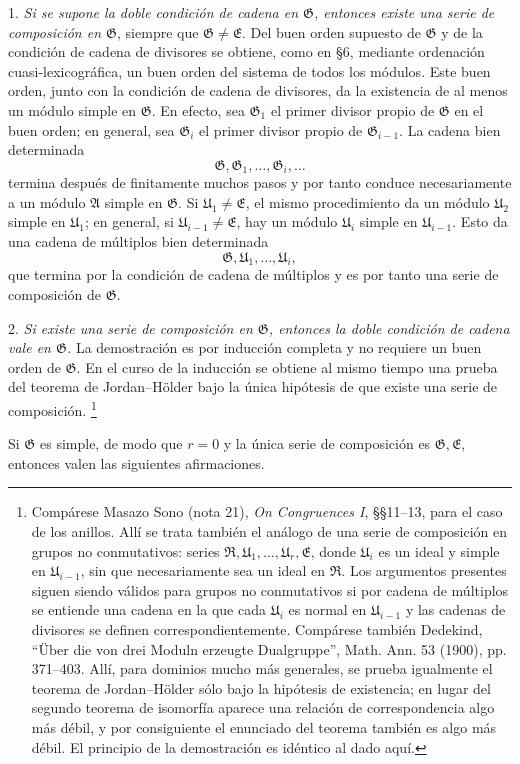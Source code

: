 \documentclass[11pt]{article}
\providecommand{\mR}{\mathfrak{R}}
\providecommand{\mA}{\mathfrak{A}}
\providecommand{\mE}{\mathfrak{E}}
\providecommand{\mG}{\mathfrak{G}}
\providecommand{\mU}{\mathfrak{U}}
\begin{document}
1. \emph{Si se supone la doble condición de cadena en $\mG$, entonces existe una serie de composición en $\mG$}, siempre que $\mG\ne\mE$. Del buen orden supuesto de $\mG$ y de la condición de cadena de divisores se obtiene, como en §6, mediante ordenación cuasi-lexicográfica, un buen orden del sistema de todos los módulos. Este buen orden, junto con la condición de cadena de divisores, da la existencia de al menos un módulo simple en $\mG$. En efecto, sea $\mG_1$ el primer divisor propio de $\mG$ en el buen orden; en general, sea $\mG_i$ el primer divisor propio de $\mG_{i-1}$. La cadena bien determinada
\[
        \mG,\mG_1,\ldots,\mG_i,\ldots
\]
termina después de finitamente muchos pasos y por tanto conduce necesariamente a un módulo $\mA$ simple en $\mG$. Si $\mU_1\ne\mE$, el mismo procedimiento da un módulo $\mU_2$ simple en $\mU_1$; en general, si $\mU_{i-1}\ne\mE$, hay un módulo $\mU_i$ simple en $\mU_{i-1}$. Esto da una cadena de múltiplos bien determinada
\[
        \mG,\mU_1,\ldots,\mU_i,
\]
que termina por la condición de cadena de múltiplos y es por tanto una serie de composición de $\mG$.

2. \emph{Si existe una serie de composición en $\mG$, entonces la doble condición de cadena vale en $\mG$.} La demostración es por inducción completa y no requiere un buen orden de $\mG$. En el curso de la inducción se obtiene al mismo tiempo una prueba del teorema de Jordan--Hölder bajo la única hipótesis de que existe una serie de composición.
\footnote{Compárese Masazo Sono (nota 21), \emph{On Congruences I}, §§11--13, para el caso de los anillos. Allí se trata también el análogo de una serie de composición en grupos no conmutativos: series $\mR,\mU_1,\ldots,\mU_r,\mE$, donde $\mU_i$ es un ideal y simple en $\mU_{i-1}$, sin que necesariamente sea un ideal en $\mR$. Los argumentos presentes siguen siendo válidos para grupos no conmutativos si por cadena de múltiplos se entiende una cadena en la que cada $\mU_i$ es normal en $\mU_{i-1}$ y las cadenas de divisores se definen correspondientemente. Compárese también Dedekind, ``Über die von drei Moduln erzeugte Dualgruppe'', Math. Ann. 53 (1900), pp. 371--403. Allí, para dominios mucho más generales, se prueba igualmente el teorema de Jordan--Hölder sólo bajo la hipótesis de existencia; en lugar del segundo teorema de isomorfía aparece una relación de correspondencia algo más débil, y por consiguiente el enunciado del teorema también es algo más débil. El principio de la demostración es idéntico al dado aquí.}

Si $\mG$ es simple, de modo que $r=0$ y la única serie de composición es $\mG,\mE$, entonces valen las siguientes afirmaciones.
\end{document}
